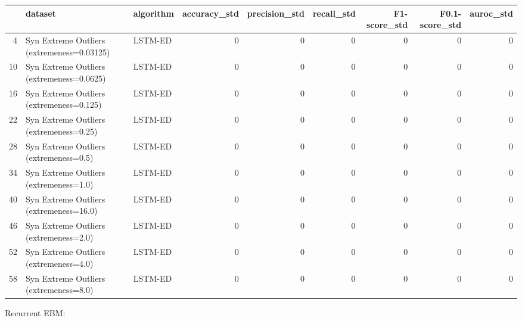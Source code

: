 \begin{tabular}{rllrrrrrr}
\hline
    & dataset                                    & algorithm   &   accuracy\_std &   precision\_std &   recall\_std &   F1-score\_std &   F0.1-score\_std &   auroc\_std \\
\hline
  4 & Syn Extreme Outliers (extremeness=0.03125) & LSTM-ED     &              0 &               0 &            0 &              0 &                0 &           0 \\
 10 & Syn Extreme Outliers (extremeness=0.0625)  & LSTM-ED     &              0 &               0 &            0 &              0 &                0 &           0 \\
 16 & Syn Extreme Outliers (extremeness=0.125)   & LSTM-ED     &              0 &               0 &            0 &              0 &                0 &           0 \\
 22 & Syn Extreme Outliers (extremeness=0.25)    & LSTM-ED     &              0 &               0 &            0 &              0 &                0 &           0 \\
 28 & Syn Extreme Outliers (extremeness=0.5)     & LSTM-ED     &              0 &               0 &            0 &              0 &                0 &           0 \\
 34 & Syn Extreme Outliers (extremeness=1.0)     & LSTM-ED     &              0 &               0 &            0 &              0 &                0 &           0 \\
 40 & Syn Extreme Outliers (extremeness=16.0)    & LSTM-ED     &              0 &               0 &            0 &              0 &                0 &           0 \\
 46 & Syn Extreme Outliers (extremeness=2.0)     & LSTM-ED     &              0 &               0 &            0 &              0 &                0 &           0 \\
 52 & Syn Extreme Outliers (extremeness=4.0)     & LSTM-ED     &              0 &               0 &            0 &              0 &                0 &           0 \\
 58 & Syn Extreme Outliers (extremeness=8.0)     & LSTM-ED     &              0 &               0 &            0 &              0 &                0 &           0 \\
\hline
\end{tabular}

Recurrent EBM:

